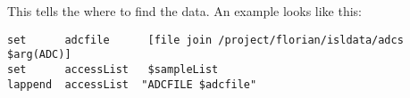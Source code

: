 
\section{}

This tells the  where to find the data. An
example looks like this:

\begin{verbatim}
set      adcfile      [file join /project/florian/isldata/adcs $arg(ADC)]
set      accessList   $sampleList
lappend  accessList  "ADCFILE $adcfile"
\end{verbatim}

